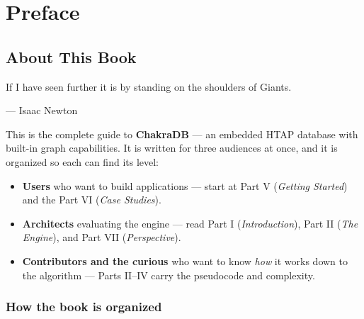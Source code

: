\documentclass[
  11pt,
  openany]{book}
\providecommand{\tightlist}{%
  \setlength{\itemsep}{0pt}\setlength{\parskip}{0pt}}
\begin{document}
\vfill
\endgroup
\clearpage
\nopagecolor
\color{black}

{
\hypersetup{linkcolor=black}
\setcounter{tocdepth}{2}
\tableofcontents
}
\mainmatter
\part{Preface}

\chapter{About This Book}\label{about-this-book}

\epigraph{If I have seen further it is by standing on the shoulders of Giants.}{--- Isaac Newton}

This is the complete guide to \textbf{ChakraDB} --- an embedded HTAP
database with built-in graph capabilities. It is written for three
audiences at once, and it is organized so each can find its level:

\begin{itemize}
\tightlist
\item
  \textbf{Users} who want to build applications --- start at Part V
  (\emph{Getting Started}) and the Part VI (\emph{Case Studies}).
\item
  \textbf{Architects} evaluating the engine --- read Part I
  (\emph{Introduction}), Part II (\emph{The Engine}), and Part VII
  (\emph{Perspective}).
\item
  \textbf{Contributors and the curious} who want to know \emph{how} it
  works down to the algorithm --- Parts II--IV carry the pseudocode and
  complexity.
\end{itemize}

\section{How the book is organized}\label{how-the-book-is-organized}
\end{document}
